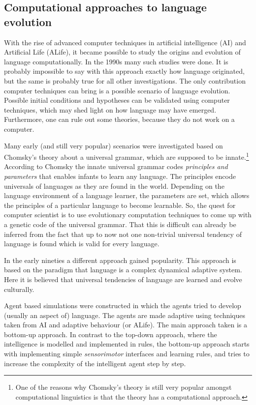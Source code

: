 
\subsection{Computational approaches to language evolution}

With the rise of advanced computer techniques in artificial intelligence (AI) and Artificial Life (ALife), it became possible to study the origins and evolution of language computationally. In the 1990s many such studies were done. It is probably impossible to say with this approach exactly how language originated, but the same is probably true for all other investigations. The only contribution computer techniques can bring is a possible scenario of language evolution. Possible initial conditions and hypotheses can be validated using computer techniques, which may shed light on how language may have emerged. Furthermore, one can rule out some theories, because they do not work on a computer.


Many early (and still very popular) scenarios were investigated based on Chomsky's theory about a {\sc universal grammar}, which are supposed to be innate.\footnote{One of the reasons why Chomsky's theory is still very popular amongst computational linguistics is that the theory has a computational approach.} According to Chomsky the innate universal grammar codes {\em principles and parameters} that enables infants to learn any language. The principles encode universals of languages as they are found in the world. Depending on the language environment of a language learner, the parameters are set, which allows the principles of a particular language to become learnable. So, the quest for computer scientist is to use evolutionary computation techniques to come up with a genetic code of the universal grammar. That this is difficult can already be inferred from the fact that up to now not one non-trivial universal tendency of language is found which is valid for every language.

In the early nineties a different approach gained popularity. This approach is based on the paradigm that language is a complex dynamical adaptive system. Here it is believed that universal tendencies of language are learned and evolve culturally.

Agent based simulations were constructed in which the agents tried to develop (usually an aspect of) language. The agents are made adaptive using techniques taken from AI and adaptive behaviour (or ALife). The main approach taken is a bottom-up approach. In contrast to the top-down approach, where the intelligence is modelled and implemented in rules, the bottom-up approach starts with implementing simple {\em sensorimotor} interfaces and learning rules, and tries to increase the complexity of the intelligent agent step by step.


